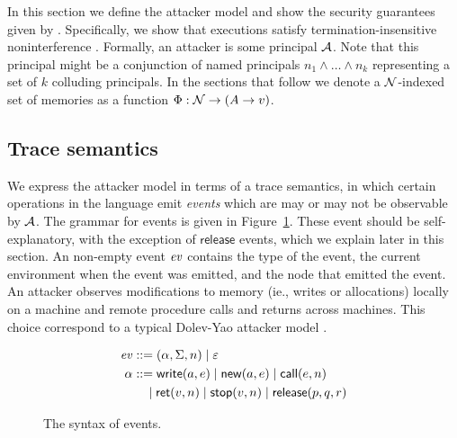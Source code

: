 In this section we define the attacker model and show the security guarantees given by \lang. Specifically, we show that \lang{} executions satisfy termination-insensitive noninterference \cite{4223226}. Formally, an attacker is some principal $\mathcal{A}$. Note that this principal might be a conjunction of named principals $n_1 \wedge \dots \wedge n_k$ representing a set of $k$ colluding principals. In the sections that follow we denote a $\mathcal{N}$-indexed set of memories as a function $\Phi: \mathcal{N} \to (A \to v)$.

\subsection{Trace semantics}
We express the attacker model in terms of a trace semantics, in which certain operations in the language emit \emph{events} which are may or may not be observable by $\mathcal{A}$. The grammar for events is given in Figure~\ref{fig:event-syntax}. These event should be self-explanatory, with the exception of $\mathsf{release}$ events, which we explain later in this section. An non-empty event $\mathit{ev}$ contains the type of the event, the current environment when the event was emitted, and the node that emitted the event. An attacker observes modifications to memory (ie., writes or allocations) locally on a machine and remote procedure calls and returns across machines. This choice correspond to a typical Dolev-Yao attacker model \cite{Dolev:1981:SPK:1382435.1382728}.

\begin{figure}
\centering
\begin{align*}
\mathit{ev} &::= (\alpha, \Sigma, n) \mid \varepsilon\\
\alpha &::= \mathsf{write}(a, e) \mid \mathsf{new}(a, e) \mid \mathsf{call}(e, n) \\ &\quad \mid \mathsf{ret}(v, n) \mid \mathsf{stop}(v, n) \mid \mathsf{release}(p, q, r)
\end{align*}
\caption{The syntax of events.}
\label{fig:event-syntax}
\end{figure}

